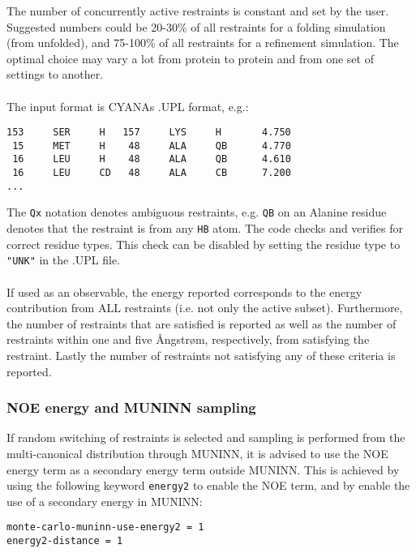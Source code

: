 The number of concurrently active restraints is constant and set by the user.
Suggested numbers could be 20-30\% of all restraints for a folding simulation (from unfolded), and 75-100\% of all restraints for a refinement simulation.
The optimal choice may vary a lot from protein to protein and from one set of settings to another.
\\\\The input format is CYANAs .UPL format, e.g.:
\begin{verbatim}
153     SER     H   157     LYS     H       4.750
 15     MET     H    48     ALA     QB      4.770
 16     LEU     H    48     ALA     QB      4.610
 16     LEU     CD   48     ALA     CB      7.200
...
\end{verbatim}
The \texttt{Qx} notation denotes ambiguous restraints, e.g. \texttt{QB} on an Alanine residue denotes that the restraint is from any \texttt{HB} atom.
The code checks and verifies for correct residue types.
This check can be disabled by setting the residue type to \texttt{"UNK"} in the .UPL file. 
\\\\If used as an observable, the energy reported corresponds to the energy contribution from ALL restraints (i.e. not only the active subset).
Furthermore, the number of restraints that are satisfied is reported as well as the number of restraints within one and five \AA ngstr\o m, respectively, from satisfying the restraint.
Lastly the number of restraints not satisfying any of these criteria is reported.

\subsubsection*{NOE energy and MUNINN sampling}
If random switching of restraints is selected and sampling is performed from the multi-canonical distribution through MUNINN, it is advised to use the NOE energy term as a secondary energy term outside MUNINN. 
This is achieved by using the following keyword \texttt{energy2} to enable the NOE term, and by enable the use of a secondary energy in MUNINN:
\begin{verbatim}
monte-carlo-muninn-use-energy2 = 1
energy2-distance = 1
\end{verbatim}
\begin{optiontable}
\end{optiontable}
